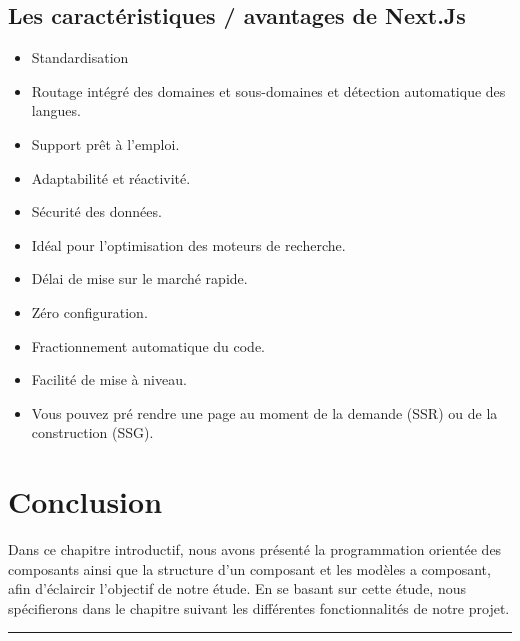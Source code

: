 \documentclass[12pt]{report}
\begin{document}
\newpage

\vspace*{0.1in}

\subsection{Les caractéristiques / avantages de Next.Js}
\vspace{0.1in}

\begin{itemize}
    \item Standardisation
    \item Routage intégré des domaines et sous-domaines et détection automatique des langues.
    \item Support prêt à l’emploi.
    \item Adaptabilité et réactivité.
    \item Sécurité des données.
    \item Idéal pour l’optimisation des moteurs de recherche.
    \item Délai de mise sur le marché rapide.
    \item Zéro configuration.
    \item Fractionnement automatique du code.
    \item Facilité de mise à niveau.
    \item Vous pouvez pré rendre une page au moment de la demande (SSR) ou de la construction (SSG).
\end{itemize}

\section{Conclusion}
\vspace{0.1in}
\indent
Dans ce chapitre introductif, nous avons présenté la programmation orientée des composants ainsi que la structure d’un composant et les modèles a composant, afin d’éclaircir l’objectif de notre étude. En se basant sur cette étude, nous spécifierons dans le chapitre suivant les différentes fonctionnalités de notre projet.

\newpage

\vspace*{-0.2in}

\begin{center}
    {\color{Blue} \rule{5.5in}{1.4mm} }\\
    \vspace{0.1in}
    \scshape{\fontsize{34}{46}{\bfseries{\color{Blue}{Conclusion générale}}}}
    \\
    \vspace{0.5in}
\end{center}

\newpage


\end{document}
